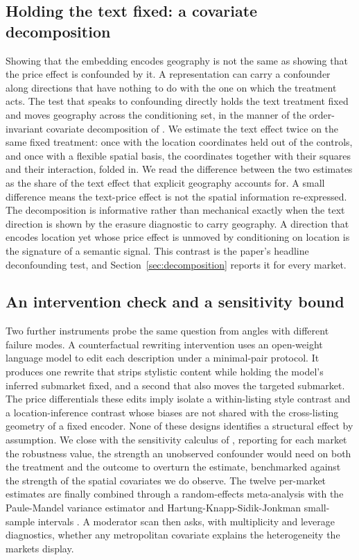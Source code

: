 \subsection{Holding the text fixed: a covariate decomposition}

Showing that the embedding encodes geography is not the same as showing that the
price effect is confounded by it. A representation can carry a confounder
along directions that have nothing to do with the one on which the treatment acts.
The test that speaks to confounding directly holds the text treatment fixed and
moves geography across the conditioning set, in the manner of the order-invariant
covariate decomposition of \citet{gelbach2016covariates}. We estimate the text
effect twice on the same fixed treatment: once with the location coordinates held
out of the controls, and once with a flexible spatial basis, the coordinates
together with their squares and their interaction, folded in. We read the
difference between the two estimates as the share of the text effect that explicit
geography accounts for. A small difference means the text-price effect is not the
spatial information re-expressed. The decomposition is informative rather than
mechanical exactly when the text direction is shown by the erasure diagnostic to
carry geography. A direction that encodes location yet whose price effect is
unmoved by conditioning on location is the signature of a semantic signal.
This contrast is the paper's headline deconfounding test, and
Section~\ref{sec:decomposition} reports it for every market.

\subsection{An intervention check and a sensitivity bound}

Two further instruments probe the same question from angles with different failure
modes. A counterfactual rewriting intervention uses an open-weight language model
to edit each description under a minimal-pair protocol. It produces one rewrite
that strips stylistic content while holding the model's inferred submarket fixed,
and a second that also moves the targeted submarket. The price differentials these
edits imply isolate a within-listing style contrast and a location-inference
contrast whose biases are not shared with the cross-listing geometry of a fixed
encoder. None of these designs identifies a structural effect by
assumption. We close with the sensitivity calculus of \citet{cinelli2020making},
reporting for each market the robustness value, the strength an unobserved
confounder would need on both the treatment and the outcome to overturn the
estimate, benchmarked against the strength of the spatial covariates we do observe.
The twelve per-market estimates are finally combined through a random-effects
meta-analysis with the Paule-Mandel variance estimator and Hartung-Knapp-Sidik-Jonkman
small-sample intervals \citep{paule1982consensus, inthout2014hartung}. A
moderator scan then asks, with multiplicity and leverage diagnostics, whether any
metropolitan covariate explains the heterogeneity the markets display.
